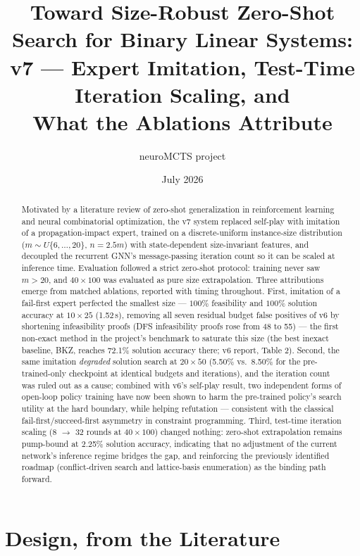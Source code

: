 \documentclass[12pt]{article}
\title{Toward Size-Robust Zero-Shot Search for Binary Linear Systems:\\
v7 --- Expert Imitation, Test-Time Iteration Scaling, and\\
What the Ablations Attribute}
\author{neuroMCTS project}
\date{July 2026}
\begin{document}
\maketitle

\begin{abstract}
Motivated by a literature review of zero-shot generalization in reinforcement learning and neural combinatorial optimization, the v7 system replaced self-play with imitation of a propagation-impact expert, trained on a discrete-uniform instance-size distribution ($m \sim U\{6,\dots,20\}$, $n = 2.5m$) with state-dependent size-invariant features, and decoupled the recurrent GNN's message-passing iteration count so it can be scaled at inference time. Evaluation followed a strict zero-shot protocol: training never saw $m > 20$, and $40 \times 100$ was evaluated as pure size extrapolation. Three attributions emerge from matched ablations, reported with timing throughout. First, imitation of a fail-first expert perfected the smallest size --- $100\%$ feasibility and $100\%$ solution accuracy at $10 \times 25$ (1.52\,s), removing all seven residual budget false positives of v6 by shortening infeasibility proofs (DFS infeasibility proofs rose from 48 to 55) --- the first non-exact method in the project's benchmark to saturate this size (the best inexact baseline, BKZ, reaches 72.1\% solution accuracy there; v6 report, Table 2). Second, the same imitation \emph{degraded} solution search at $20 \times 50$ (5.50\% vs.\ 8.50\% for the pre-trained-only checkpoint at identical budgets and iterations), and the iteration count was ruled out as a cause; combined with v6's self-play result, two independent forms of open-loop policy training have now been shown to harm the pre-trained policy's search utility at the hard boundary, while helping refutation --- consistent with the classical fail-first/succeed-first asymmetry in constraint programming. Third, test-time iteration scaling (8 $\rightarrow$ 32 rounds at $40 \times 100$) changed nothing: zero-shot extrapolation remains pump-bound at 2.25\% solution accuracy, indicating that no adjustment of the current network's inference regime bridges the gap, and reinforcing the previously identified roadmap (conflict-driven search and lattice-basis enumeration) as the binding path forward.
\end{abstract}

\section{Design, from the Literature}
\end{document}
